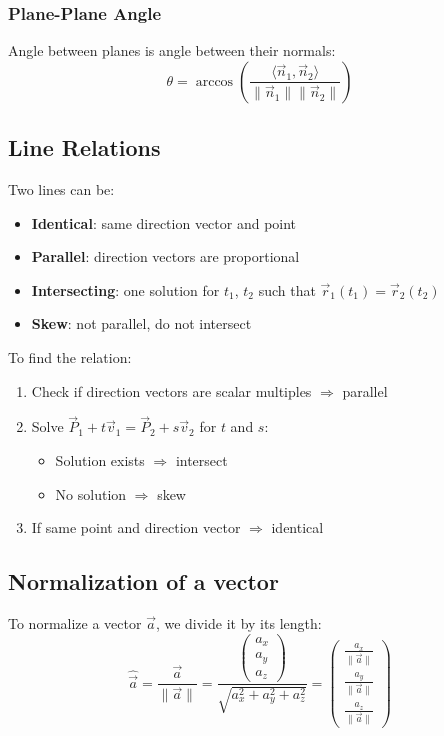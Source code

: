 \subsubsection*{Plane-Plane Angle}
Angle between planes is angle between their normals:
\[
	\theta = \arccos\left( \frac{\langle\vec{n}_1, \vec{n}_2\rangle}{\|\vec{n}_1\|\|\vec{n}_2\|} \right)
\]

\subsection{Line Relations}
Two lines can be:

\begin{itemize}
	\item \textbf{Identical}: same direction vector and point
	\item \textbf{Parallel}: direction vectors are proportional
	\item \textbf{Intersecting}: one solution for $t_1$, $t_2$ such that $\vec{r}_1(t_1) = \vec{r}_2(t_2)$
	\item \textbf{Skew}: not parallel, do not intersect
\end{itemize}

To find the relation:
\begin{enumerate}
	\item Check if direction vectors are scalar multiples $\Rightarrow$ parallel
	\item Solve $\vec{P}_1 + t\vec{v}_1 = \vec{P}_2 + s\vec{v}_2$ for $t$ and $s$:
	      \begin{itemize}
		      \item Solution exists $\Rightarrow$ intersect
		      \item No solution $\Rightarrow$ skew
	      \end{itemize}
	\item If same point and direction vector $\Rightarrow$ identical
\end{enumerate}

\subsection{Normalization of a vector}
To normalize a vector $\vec{a}$, we divide it by its length:
\[
	\hat{\vec{a}} = \frac{\vec{a}}{\|\vec{a}\|} = \frac{\begin{pmatrix} a_x \\ a_y \\ a_z \end{pmatrix}}{\sqrt{a_x^2 + a_y^2 + a_z^2}} = \begin{pmatrix} \frac{a_x}{\|\vec{a}\|} \\ \frac{a_y}{\|\vec{a}\|} \\ \frac{a_z}{\|\vec{a}\|} \end{pmatrix}
\]

